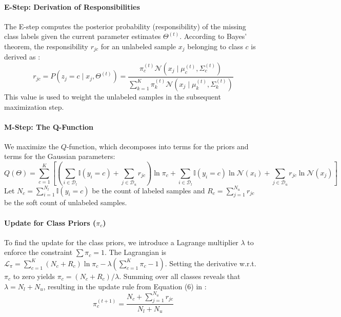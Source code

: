\documentclass[11pt, a4paper]{article}
\begin{document}
\paragraph{E-Step: Derivation of Responsibilities}
The E-step computes the posterior probability (responsibility) of the missing class labels given the current parameter estimates $\Theta^{(t)}$. According to Bayes' theorem, the responsibility $r_{jc}$ for an unlabeled sample $x_j$ belonging to class $c$ is derived as \citep{He2020}:
\begin{equation}
    r_{jc} = P(z_j = c \mid x_j, \Theta^{(t)}) = \frac{\pi_c^{(t)} \mathcal{N}(x_j \mid \mu_c^{(t)}, \Sigma_c^{(t)})}{\sum_{k=1}^K \pi_k^{(t)} \mathcal{N}(x_j \mid \mu_k^{(t)}, \Sigma_k^{(t)})}
\end{equation}
This value is used to weight the unlabeled samples in the subsequent maximization step.

\paragraph{M-Step: The Q-Function}
We maximize the $Q$-function, which decomposes into terms for the priors and terms for the Gaussian parameters:
\begin{equation}
    Q(\Theta) = \sum_{c=1}^K \left[ \left( \sum_{i \in \mathcal{D}_l} \mathbb{I}(y_i=c) + \sum_{j \in \mathcal{D}_u} r_{jc} \right) \ln \pi_c + \sum_{i \in \mathcal{D}_l} \mathbb{I}(y_i=c) \ln \mathcal{N}(x_i) + \sum_{j \in \mathcal{D}_u} r_{jc} \ln \mathcal{N}(x_j) \right]
\end{equation}
Let $N_c = \sum_{i=1}^{N_l} \mathbb{I}(y_i=c)$ be the count of labeled samples and $R_c = \sum_{j=1}^{N_u} r_{jc}$ be the soft count of unlabeled samples.

\paragraph{Update for Class Priors ($\pi_c$)}
To find the update for the class priors, we introduce a Lagrange multiplier $\lambda$ to enforce the constraint $\sum \pi_c = 1$. The Lagrangian is $\mathcal{L}_{\pi} = \sum_{c=1}^K (N_c + R_c) \ln \pi_c - \lambda (\sum_{c=1}^K \pi_c - 1)$. Setting the derivative w.r.t. $\pi_c$ to zero yields $\pi_c = (N_c + R_c)/\lambda$. Summing over all classes reveals that $\lambda = N_l + N_u$, resulting in the update rule from Equation (6) in \citep{He2020}:
\begin{equation}
    \pi_c^{(t+1)} = \frac{N_c + \sum_{j=1}^{N_u} r_{jc}}{N_l + N_u}
\end{equation}
\end{document}
